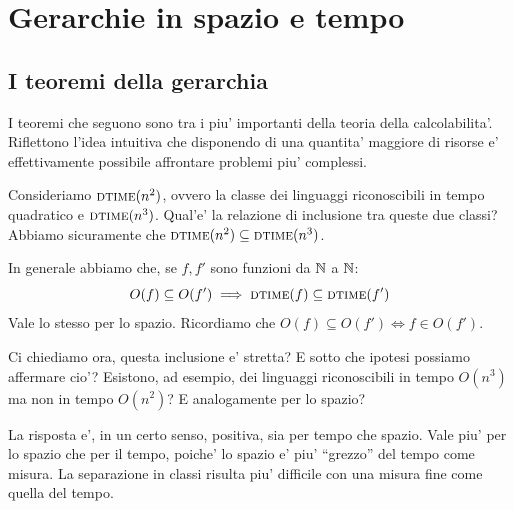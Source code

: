 %
%
%
%
\chapter{Gerarchie in spazio e tempo}


\section{I teoremi della gerarchia}

I teoremi che seguono sono tra i piu' importanti della teoria della calcolabilita'. Riflettono
l'idea intuitiva che disponendo di una quantita' maggiore di risorse e' effettivamente possibile
affrontare problemi piu' complessi.

Consideriamo $\textsc{dtime}(n^{2})$, ovvero la classe dei linguaggi riconoscibili in tempo quadratico e
$\textsc{dtime}(n^{3})$. Qual'e' la relazione di inclusione tra queste due classi? Abbiamo sicuramente che
$\textsc{dtime}(n^{2}) \subseteq \textsc{dtime}(n^{3})$.

In generale abbiamo che, se $f,f'$ sono funzioni da $\mathbb{N}$ a $\mathbb{N}$:
\begin{equation*}
    O(f) \subseteq O(f') \implies \textsc{dtime}(f) \subseteq \textsc{dtime}(f')
\end{equation*}
Vale lo stesso per lo spazio. Ricordiamo che $O(f) \subseteq O(f') \iff f \in O(f')$.

Ci chiediamo ora, questa inclusione e' stretta? E sotto che ipotesi possiamo affermare cio'?
Esistono, ad esempio, dei linguaggi riconoscibili in tempo $O(n^{3})$ ma non in tempo $O(n^{2})$? E
analogamente per lo spazio?

La risposta e', in un certo senso, positiva, sia per tempo che spazio. Vale piu' per lo spazio che
per il tempo, poiche' lo spazio e' piu' ``grezzo'' del tempo come misura. La separazione in classi
risulta piu' difficile con una misura fine come quella del tempo.


